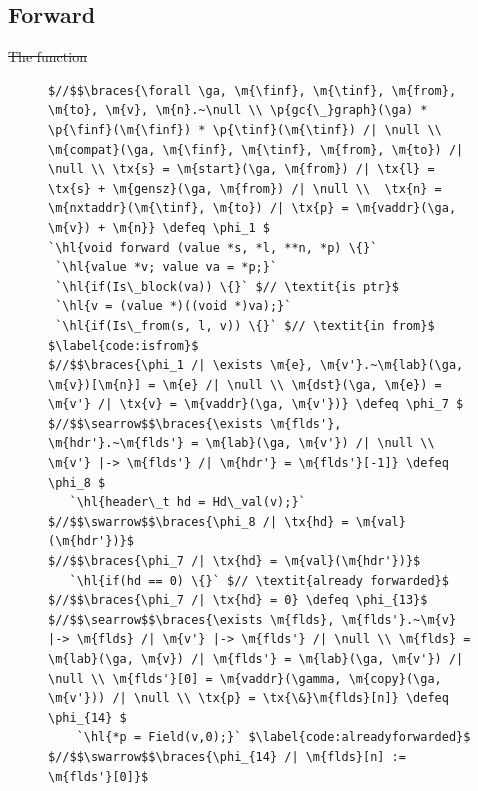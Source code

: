 \documentclass[acmsmall,screen]{acmart}  %
\makeatletter
\newcommand{\finf}{finf} %
\newcommand{\tinf}{tinf} %
\newcommand{\braces}[1]{\left\{\!\!\!\begin{array}{l@{}} #1 \end{array}\right\}} %
\newcommand{\ga}{\gamma} %
\newcommand{\defeq}{\mathbin{\stackrel{\triangle}{=}}} %
\newcommand{\tx}[1]{\text{#1}}
\newcommand{\p}[1]{\ensuremath{\mathsf{#1}}} \newcommand{\m}[1]{\ensuremath{\mathit{#1}}} \newcommand{\ma}[1]{\ensuremath{\mathcal{#1}}} \let\ramify\lightning
\newcommand{\hl}[1]{\colorbox{lightgray}{#1}} %
\providecommand{\DIFdel}[1]{{\protect\color{red}\sout{#1}}}                      %
\providecommand{\DIFaddbegin}{} %
\providecommand{\DIFdelbegin}{} %
\providecommand{\DIFdelend}{} %
\newcommand{\DIFscaledelfig}{0.5}
\newlength{\DIFdelgraphicswidth} %
\newlength{\DIFdelgraphicsheight} %
\newcommand{\DIFaddincludegraphics}[2][]{{\color{blue}\fbox{\DIFOincludegraphics[#1]{#2}}}} %
\newcommand{\DIFdelincludegraphics}[2][]{%
\sbox{\DIFdelgraphicsbox}{\DIFOincludegraphics[#1]{#2}}%
\settoboxwidth{\DIFdelgraphicswidth}{\DIFdelgraphicsbox} %
\settoboxtotalheight{\DIFdelgraphicsheight}{\DIFdelgraphicsbox} %
\scalebox{\DIFscaledelfig}{%
\parbox[b]{\DIFdelgraphicswidth}{\usebox{\DIFdelgraphicsbox}\\[-\baselineskip] \rule{\DIFdelgraphicswidth}{0em}}\llap{\resizebox{\DIFdelgraphicswidth}{\DIFdelgraphicsheight}{%
\setlength{\unitlength}{\DIFdelgraphicswidth}%
\begin{picture}(1,1)%
\thicklines\linethickness{2pt} %
{\color[rgb]{1,0,0}\put(0,0){\framebox(1,1){}}}%
{\color[rgb]{1,0,0}\put(0,0){\line( 1,1){1}}}%
{\color[rgb]{1,0,0}\put(0,1){\line(1,-1){1}}}%
\end{picture}%
}\hspace*{3pt}}} %
} %
\DeclareRobustCommand{\DIFaddbegin}{\DIFOaddbegin \let\includegraphics\DIFaddincludegraphics} %
\DeclareRobustCommand{\DIFdelbegin}{\DIFOdelbegin \let\includegraphics\DIFdelincludegraphics} %
\DeclareRobustCommand{\DIFdelend}{\DIFOaddend \let\includegraphics\DIFOincludegraphics} %
\makeatother
\begin{document}
\subsection{Forward}
\label{sec:gcforward}
\DIFdelbegin \DIFdel{The function }%
\DIFdelend \DIFaddbegin \renewcommand{\tx}[1]{\scriptsize {\text{#1}}}

\begin{figure}[!ht]
\vspace{-1ex}
  \begin{lstlisting}[multicols=2]
$//$$\braces{\forall \ga, \m{\finf}, \m{\tinf}, \m{from}, \m{to}, \m{v}, \m{n}.~\null \\ \p{gc{\_}graph}(\ga) * \p{\finf}(\m{\finf}) * \p{\tinf}(\m{\tinf}) /| \null \\ \m{compat}(\ga, \m{\finf}, \m{\tinf}, \m{from}, \m{to}) /| \null \\ \tx{s} = \m{start}(\ga, \m{from}) /| \tx{l} = \tx{s} + \m{gensz}(\ga, \m{from}) /| \null \\  \tx{n} = \m{nxtaddr}(\m{\tinf}, \m{to}) /| \tx{p} = \m{vaddr}(\ga, \m{v}) + \m{n}} \defeq \phi_1 $
`\hl{void forward (value *s, *l, **n, *p) \{}`
 `\hl{value *v; value va = *p;}` 
 `\hl{if(Is\_block(va)) \{}` $// \textit{is ptr}$
 `\hl{v = (value *)((void *)va);}` 
 `\hl{if(Is\_from(s, l, v)) \{}` $// \textit{in from}$ $\label{code:isfrom}$
$//$$\braces{\phi_1 /| \exists \m{e}, \m{v'}.~\m{lab}(\ga, \m{v})[\m{n}] = \m{e} /| \null \\ \m{dst}(\ga, \m{e}) = \m{v'} /| \tx{v} = \m{vaddr}(\ga, \m{v'})} \defeq \phi_7 $
$//$$\searrow$$\braces{\exists \m{flds'}, \m{hdr'}.~\m{flds'} = \m{lab}(\ga, \m{v'}) /| \null \\ \m{v'} |-> \m{flds'} /| \m{hdr'} = \m{flds'}[-1]} \defeq \phi_8 $
   `\hl{header\_t hd = Hd\_val(v);}`
$//$$\swarrow$$\braces{\phi_8 /| \tx{hd} = \m{val}(\m{hdr'})}$
$//$$\braces{\phi_7 /| \tx{hd} = \m{val}(\m{hdr'})}$ 
   `\hl{if(hd == 0) \{}` $// \textit{already forwarded}$
$//$$\braces{\phi_7 /| \tx{hd} = 0} \defeq \phi_{13}$ 
$//$$\searrow$$\braces{\exists \m{flds}, \m{flds'}.~\m{v} |-> \m{flds} /| \m{v'} |-> \m{flds'} /| \null \\ \m{flds} = \m{lab}(\ga, \m{v}) /| \m{flds'} = \m{lab}(\ga, \m{v'}) /| \null \\ \m{flds'}[0] = \m{vaddr}(\gamma, \m{copy}(\ga, \m{v'})) /| \null \\ \tx{p} = \tx{\&}\m{flds}[n]} \defeq \phi_{14} $
    `\hl{*p = Field(v,0);}` $\label{code:alreadyforwarded}$
$//$$\swarrow$$\braces{\phi_{14} /| \m{flds}[n] := \m{flds'}[0]}$

\end{lstlisting}
\end{figure}
\end{document}
